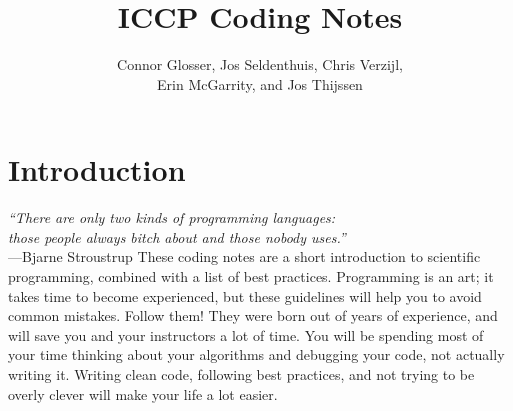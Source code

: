 \documentclass[openany,oneside]{report}
\renewenvironment{quote}{\list{}{\leftmargin=8\parindent}\item\relax}{\endlist}
\begin{document}
\title{ICCP Coding Notes}
\author{Connor Glosser, Jos Seldenthuis, Chris Verzijl, \\ 
  Erin McGarrity, and Jos Thijssen}
\maketitle
\tableofcontents

\chapter{Introduction}
\label{chap:Introduction}

\begin{quote}\small
\emph{``There are only two kinds of programming languages: \\ those people always bitch about and those nobody uses.''} \\ \hspace*{\fill}---Bjarne Stroustrup
\end{quote}
These coding notes are a short introduction to scientific programming, combined with a list of best practices.
Programming is an art; it takes time to become experienced, but these guidelines will help you to avoid common mistakes.
Follow them! They were born out of years of experience, and will save you and your instructors a lot of time.
You will be spending most of your time thinking about your algorithms and debugging your code, not actually writing it.
Writing clean code, following best practices, and not trying to be overly clever will make your life a lot easier.
\end{document}

